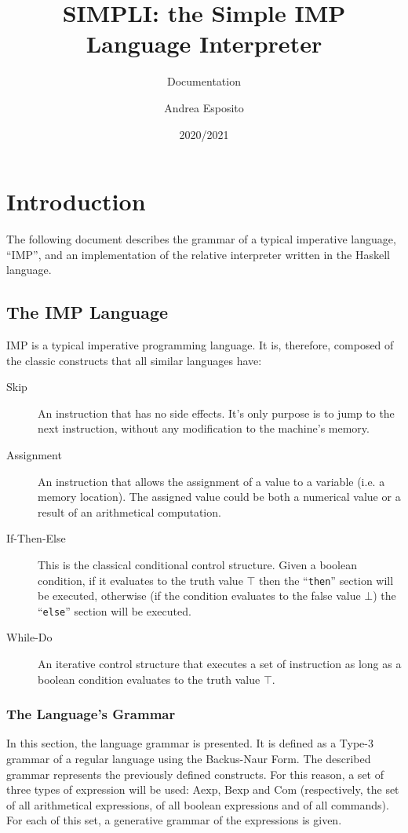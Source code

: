 \documentclass{esposito-documentation}
\title{SIMPLI: the Simple IMP Language Interpreter}
\subtitle{Documentation}
\author{Andrea Esposito}
\date{2020/2021}
\begin{document}
\frontmatter
\maketitle
\colophon
\tableofcontents

\mainmatter
\chapter{Introduction}

The following document describes the grammar of a typical imperative language,
``IMP'', and an implementation of the relative interpreter written in the
Haskell language.

\section{The IMP Language}

IMP is a typical imperative programming language. It is, therefore, composed of
the classic constructs that all similar languages have:
\begin{description}
	\item[Skip] An instruction that has no side effects. It's only purpose is
		to jump to the next instruction, without any modification to the
		machine's memory.
	\item[Assignment] An instruction that allows the assignment of a value to a
		variable (i.e. a memory location). The assigned value could be both a
		numerical value or a result of an arithmetical computation.
	\item[If-Then-Else] This is the classical conditional control structure.
		Given a boolean condition, if it evaluates to the truth value $\top$
		then the ``\texttt{then}'' section will be executed, otherwise (if the
		condition evaluates to the false value $\bot$) the ``\texttt{else}''
		section will be executed.
	\item[While-Do] An iterative control structure that executes a set of
		instruction as long as a boolean condition evaluates to the truth value
		$\top$.
\end{description}

\subsection{The Language's Grammar}

In this section, the language grammar is presented. It is defined as a Type-3
grammar of a regular language using the Backus-Naur Form. The described grammar
represents the previously defined constructs. For this reason, a set of three
types of expression will be used: $\mathrm{Aexp}$, $\mathrm{Bexp}$ and
$\mathrm{Com}$ (respectively, the set of all arithmetical expressions, of all
boolean expressions and of all commands). For each of this set, a generative
grammar of the expressions is given.
\end{document}
